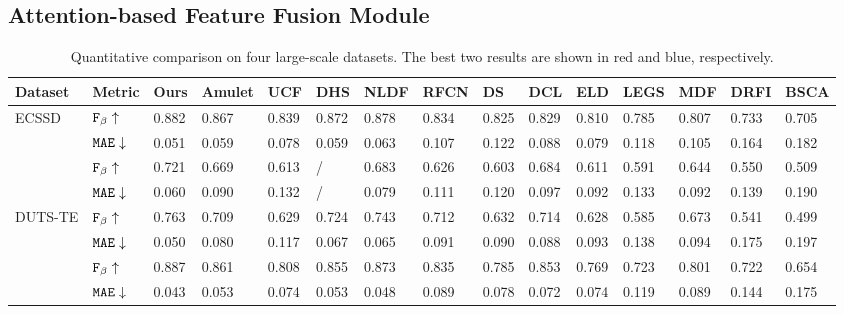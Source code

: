 \documentclass[journal]{IEEEtran}
\begin{document}
\subsection{Attention-based Feature Fusion Module}
\begin{table*}[thp]
\begin{center}
\caption{Quantitative comparison on four large-scale datasets. The best two results are shown in \textcolor[rgb]{1,0,0}{red} and \textcolor[rgb]{0,0,1}{blue}, respectively.}
\begin{tabular}{|p{1.8cm}<{\centering}|p{1.3cm}<{\centering}|p{0.6cm}<{\centering} p{0.6cm}<{\centering} p{0.6cm}<{\centering} p{0.6cm}<{\centering}  p{0.6cm}<{\centering} p{0.6cm}<{\centering} p{0.6cm}<{\centering} p{0.6cm}<{\centering} p{0.6cm}<{\centering} p{0.6cm}<{\centering} p{0.6cm}<{\centering} p{0.6cm}<{\centering} p{0.6cm}<{\centering}|}
\hline
Dataset&Metric&Ours&Amulet&UCF&DHS&NLDF&RFCN&DS&DCL&ELD&LEGS&MDF&DRFI&BSCA\\
\hline
\multirow{3}{*}{ECSSD}&$\tt{F_{\beta}\uparrow}$&\textcolor[rgb]{1,0,0}{0.882}&0.867&0.839&0.872&\textcolor[rgb]{0,0,1}{0.878}&0.834&0.825&0.829&0.810&0.785&0.807&0.733&0.705\\
&$\tt{MAE}\downarrow$&\textcolor[rgb]{1,0,0}{0.051}&\textcolor[rgb]{0,0,1}{0.059}&0.078&0.059&0.063&0.107&0.122&0.088&0.079&0.118&0.105&0.164&0.182\\
\hline
\multirow{3}{*}{DUT-OMRON}&$\tt{F_{\beta}\uparrow}$&\textcolor[rgb]{1,0,0}{0.721}&0.669&0.613&/&\textcolor[rgb]{0,0,1}{0.683}&0.626&0.603&0.684&0.611&0.591&0.644&0.550&0.509\\
&$\tt{MAE}\downarrow$&\textcolor[rgb]{1,0,0}{0.060}&0.090&0.132&/&\textcolor[rgb]{0,0,1}{0.079}&0.111&0.120&0.097&0.092&0.133&0.092&0.139&0.190\\
\hline
\multirow{3}{*}{DUTS-TE}&$\tt{F_{\beta}\uparrow}$&\textcolor[rgb]{1,0,0}{0.763}&0.709&0.629&0.724&\textcolor[rgb]{0,0,1}{0.743}&0.712&0.632&0.714&0.628&0.585&0.673&0.541&0.499\\
&$\tt{MAE}\downarrow$&\textcolor[rgb]{1,0,0}{0.050}&0.080&0.117&0.067&\textcolor[rgb]{0,0,1}{0.065}&0.091&0.090&0.088&0.093&0.138&0.094&0.175&0.197\\
\hline
\multirow{3}{*}{HKU-IS}&$\tt{F_{\beta}\uparrow}$&\textcolor[rgb]{1,0,0}{0.887}&0.861&0.808&0.855&\textcolor[rgb]{0,0,1}{0.873}&0.835&0.785&0.853&0.769&0.723&0.801&0.722&0.654\\
&$\tt{MAE}\downarrow$&\textcolor[rgb]{1,0,0}{0.043}&0.053&0.074&0.053&\textcolor[rgb]{0,0,1}{0.048}&0.089&0.078&0.072&0.074&0.119&0.089&0.144&0.175\\
\hline
\end{tabular}
\label{table}
\vspace{-4mm}
\end{center}
\end{table*}
\end{document}

